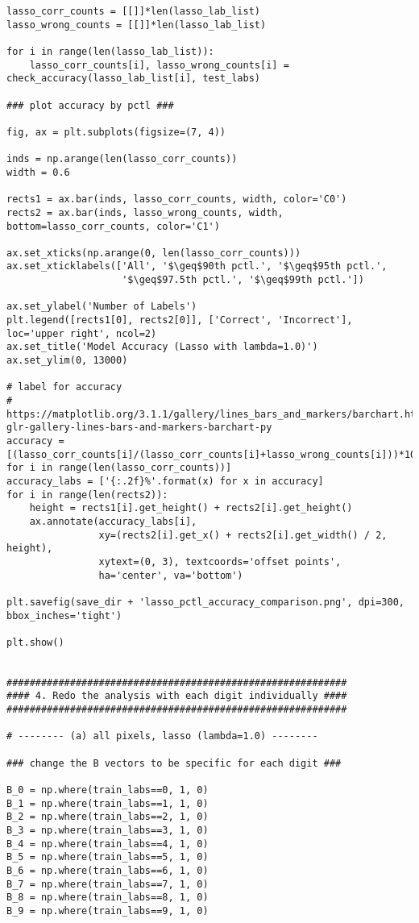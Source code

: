 \documentclass[10pt]{article}
\begin{document}
\begin{lstlisting}
lasso_corr_counts = [[]]*len(lasso_lab_list)
lasso_wrong_counts = [[]]*len(lasso_lab_list)

for i in range(len(lasso_lab_list)):
    lasso_corr_counts[i], lasso_wrong_counts[i] = check_accuracy(lasso_lab_list[i], test_labs)

### plot accuracy by pctl ###

fig, ax = plt.subplots(figsize=(7, 4))

inds = np.arange(len(lasso_corr_counts))
width = 0.6

rects1 = ax.bar(inds, lasso_corr_counts, width, color='C0')
rects2 = ax.bar(inds, lasso_wrong_counts, width, bottom=lasso_corr_counts, color='C1')

ax.set_xticks(np.arange(0, len(lasso_corr_counts)))
ax.set_xticklabels(['All', '$\geq$90th pctl.', '$\geq$95th pctl.',
                    '$\geq$97.5th pctl.', '$\geq$99th pctl.'])

ax.set_ylabel('Number of Labels')
plt.legend([rects1[0], rects2[0]], ['Correct', 'Incorrect'], loc='upper right', ncol=2)
ax.set_title('Model Accuracy (Lasso with lambda=1.0)')
ax.set_ylim(0, 13000)

# label for accuracy
# https://matplotlib.org/3.1.1/gallery/lines_bars_and_markers/barchart.html#sphx-glr-gallery-lines-bars-and-markers-barchart-py
accuracy = [(lasso_corr_counts[i]/(lasso_corr_counts[i]+lasso_wrong_counts[i]))*100. for i in range(len(lasso_corr_counts))]
accuracy_labs = ['{:.2f}%'.format(x) for x in accuracy]
for i in range(len(rects2)):
    height = rects1[i].get_height() + rects2[i].get_height()
    ax.annotate(accuracy_labs[i],
                xy=(rects2[i].get_x() + rects2[i].get_width() / 2, height),
                xytext=(0, 3), textcoords='offset points',
                ha='center', va='bottom')

plt.savefig(save_dir + 'lasso_pctl_accuracy_comparison.png', dpi=300, bbox_inches='tight')

plt.show()


###########################################################
#### 4. Redo the analysis with each digit individually ####
###########################################################

# -------- (a) all pixels, lasso (lambda=1.0) --------

### change the B vectors to be specific for each digit ###

B_0 = np.where(train_labs==0, 1, 0)
B_1 = np.where(train_labs==1, 1, 0)
B_2 = np.where(train_labs==2, 1, 0)
B_3 = np.where(train_labs==3, 1, 0)
B_4 = np.where(train_labs==4, 1, 0)
B_5 = np.where(train_labs==5, 1, 0)
B_6 = np.where(train_labs==6, 1, 0)
B_7 = np.where(train_labs==7, 1, 0)
B_8 = np.where(train_labs==8, 1, 0)
B_9 = np.where(train_labs==9, 1, 0)


\end{lstlisting}
\end{document}
